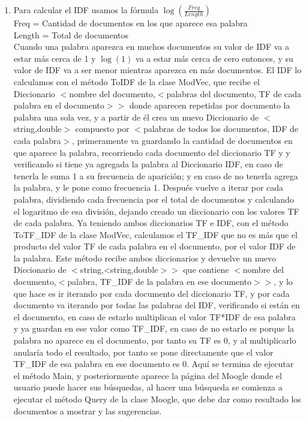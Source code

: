 \documentclass[12pt, a4paper]{article}
\begin{document}
\begin{enumerate}
      \item Para calcular el IDF usamos la fórmula $\log(\frac{Freq}{Length})$\\
            Freq = Cantidad de documentos en los que aparece esa palabra\\
            Length = Total de documentos\\
            Cuando una palabra aparezca en muchos documentos su valor de IDF va a estar más
            cerca de 1 y $\log(1)$ va a estar más cerca de cero entonces, y su valor de IDF va a
            ser menor mientras aparezca en más documentos.
            El IDF lo calculamos con el método ToIDF de la clase ModVec, que recibe
            el Diccionario
            $<$nombre del documento,$<$palabras del documento, TF de cada palabra en el documento$>>$
            donde aparecen repetidas por documento la palabra una sola vez, y a partir de él
            crea un nuevo Diccionario de $<$string,double$>$ compuesto por
            $<$palabras de todos los documentos, IDF de cada palabra$>$, primeramente va guardando
            la cantidad de documentos en que aparece la palabra, recorriendo cada documento
            del diccionario TF y y verificando si tiene ya agregada la palabra al
            Diccionario IDF, en caso de tenerla le suma 1 a su frecuencia de aparición;
            y en caso de no tenerla agrega la palabra, y le pone como frecuencia 1.
            Después vuelve a iterar por cada palabra, dividiendo cada frecuencia por el total
            de documentos y calculando el logaritmo de esa división, dejando creado un
            diccionario con los valores TF de cada palabra.
            Ya teniendo ambos diccionarios TF e IDF, con el método ToTF\_IDF de la clase ModVec,
            calculamos el TF\_IDF que no es más que el producto del valor TF de cada palabra
            en el documento, por el valor IDF de la palabra. Este método recibe ambos diccionarios y
            devuelve un nuevo Diccionario de $<$string,<string,double$>>$ que contiene
            $<$nombre del documento,$<$palabra, TF\_IDF de la palabra en ese documento$>>$,
            y lo que hace es ir iterando por cada documento del diccionario TF, y por cada documento
            va iterando por todas las palabras del IDF, verificando si están en el documento,
            en caso de estarlo multiplican el valor TF*IDF de esa palabra y ya guardan en ese
            valor como TF\_IDF, en caso de no estarlo es porque la palabra no aparece en el documento,
            por tanto su TF es 0, y al multiplicarlo anularía todo el resultado, por tanto se
            pone directamente que el valor TF\_IDF de esa palabra en ese documento es 0.
            Aquí se termina de ejecutar el método Main, y posteriormente aparece la página del Moogle
            donde el usuario puede hacer sus búsquedas, al hacer una búsqueda se comienza a ejecutar
            el método Query de la clase Moogle, que debe dar como resultado los documentos a mostrar y
            las sugerencias.


\end{enumerate}
\end{document}

